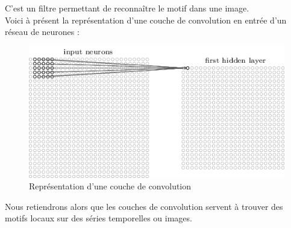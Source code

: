 \documentclass[10pt,a4paper]{report}
\begin{document}
			C'est un filtre permettant de reconnaître le motif \smiley{} dans une image.\\
			Voici à présent la représentation d'une couche de convolution en entrée d'un réseau de neurones :
			\begin{figure}[H]
				\begin{center}
					\includegraphics[scale=0.60]{Images/convolutionlayer.png}
					\caption{Représentation d'une couche de convolution}
				\end{center}
			\end{figure}
			Nous retiendrons alors que les couches de convolution servent à trouver des motifs locaux sur des séries temporelles ou images.
\end{document}
